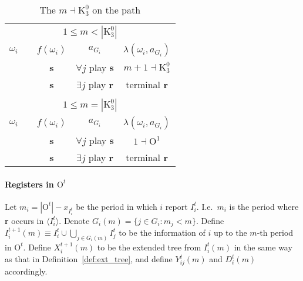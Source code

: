 \documentclass[12pt,letter]{article}
\newcommand{\Kappa}{\mathrm{K}}
\newcommand{\Omicron}{\mathrm{O}}
\theoremstyle{definition}
\theoremstyle{remark}
\theoremstyle{claim}
\begin{document}
\begin{table}[!htbp]
\caption{The $m\dashv\Kappa^0_{3}$ on the path}
\label{table:eqm_path_k03}
\begin{center}
\begin{tabular}{c c | c | c | c}
\multicolumn{5}{c}{$1\leq m < |\Kappa^0_3|$}\\
$\omega_i$ 	 & 	   &	$f(\omega_i)$  &	$a_{G_i}$ & $\lambda(\omega_i,a_{G_i})$ \\
\hline
\hline
  	&	& \textbf{s} & $\forall j$ play $\textbf{s}$ 	& $m+1\dashv \Kappa^0_{3}$\\
  	&  & \textbf{s}  &  $\exists j$ play $\textbf{r}$  	& terminal \textbf{r}\\
\hline
\\
\multicolumn{5}{c}{$1\leq m = |\Kappa^0_3|$}\\
$\omega_i$ 	 & 	   &	$f(\omega_i)$  &	$a_{G_i}$ & $\lambda(\omega_i,a_{G_i})$ \\
\hline
\hline
  	& 	& \textbf{s} & $\forall j$ play $\textbf{s}$ 	& $1\dashv \Omicron^1$\\
  	&  & \textbf{s}  &  $\exists j$ play $\textbf{r}$  	& terminal \textbf{r}\\
\hline
\end{tabular}
\end{center}
\end{table}



\clearpage

\paragraph{Registers in $\Omicron^t$}
Let $m_i=|\Omicron^t|-x_{I^t_i}$ be the period in which $i$ report $I^t_i$. I.e.~$m_i$ is the period where \textbf{r} occurs in $\langle I^t_i \rangle$. 
Denote $G_i(m)=\{j\in G_i: m_j<m\}$. Define $I^{t+1}_i(m)\equiv I^t_i\cup\bigcup_{j\in G_i(m)}I^t_j$ to be the information of $i$ up to the $m$-th period in $\Omicron^t$. 
Define $X^{t+1}_i(m)$ to be the extended tree from $I^t_i(m)$ in the same way as that in Definition~\ref{def:ext_tree}, and define $Y^t_{ij}(m)$ and $D^t_i(m)$ accordingly.
\end{document}
